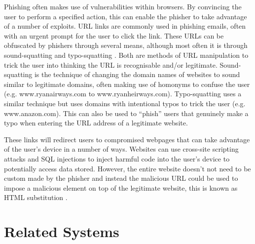 \documentclass{l4proj}
\begin{document}
Phishing often makes use of vulnerabilities within browsers. By convincing the user to perform a specified action, this can enable the phisher to take advantage of a number of exploits. URL links are commonly used in phishing emails, often with an urgent prompt for the user to click the link. These URLs can be obfuscated by phishers through several means, although most often it is through sound-squatting and typo-squatting \citep{chiew2018survey}. Both are methods of URL manipulation to trick the user into thinking the URL is recognisable and/or legitimate. Sound-squatting is the technique of changing the domain names of websites to sound similar to legitimate domains, often making use of homonyms to confuse the user (e.g. www.ryanairways.com to www.ryanheirways.com). Typo-squatting uses a similar technique but uses domains with intentional typos to trick the user (e.g. www.anazon.com). This can also be used to “phish” users that genuinely make a typo when entering the URL address of a legitimate website.
\newline

These links will redirect users to compromised webpages that can take advantage of the user’s device in a number of ways. Websites can use cross-site scripting attacks and SQL injections to inject harmful code into the user’s device to potentially access data stored. However, the entire website doesn’t not need to be custom made by the phisher and instead the malicious URL could be used to impose a malicious element on top of the legitimate website, this is known as HTML substitution \citep{chiew2018survey}.
\newline

\section{Related Systems}
\end{document}
